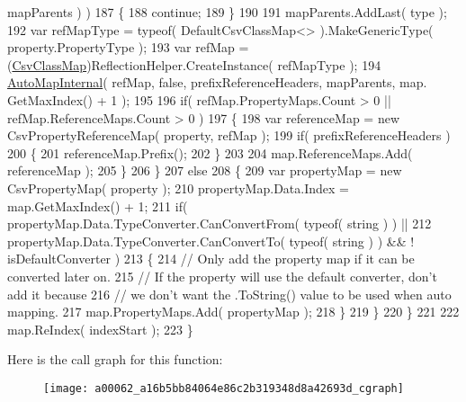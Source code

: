 \begin{DoxyCode}
      mapParents ) )
187                     \{
188                         \textcolor{keywordflow}{continue};
189                     \}
190 
191                     mapParents.AddLast( type );
192                     var refMapType = typeof( DefaultCsvClassMap<> ).MakeGenericType( property.PropertyType 
      );
193                     var refMap = (\hyperlink{a00062_affc5ae8f2b0406d496bcbdf246da6210}{CsvClassMap})ReflectionHelper.CreateInstance( refMapType );
194                     \hyperlink{a00062_a16b5bb84064e86c2b319348d8a42693d}{AutoMapInternal}( refMap, \textcolor{keyword}{false}, prefixReferenceHeaders, mapParents, map.
      GetMaxIndex() + 1 );
195 
196                     \textcolor{keywordflow}{if}( refMap.PropertyMaps.Count > 0 || refMap.ReferenceMaps.Count > 0 )
197                     \{
198                         var referenceMap = \textcolor{keyword}{new} CsvPropertyReferenceMap( property, refMap );
199                         \textcolor{keywordflow}{if}( prefixReferenceHeaders )
200                         \{
201                             referenceMap.Prefix();
202                         \}
203 
204                         map.ReferenceMaps.Add( referenceMap );
205                     \}
206                 \}
207                 \textcolor{keywordflow}{else}
208                 \{
209                     var propertyMap = \textcolor{keyword}{new} CsvPropertyMap( property );
210                     propertyMap.Data.Index = map.GetMaxIndex() + 1;
211                     \textcolor{keywordflow}{if}( propertyMap.Data.TypeConverter.CanConvertFrom( typeof( \textcolor{keywordtype}{string} ) ) ||
212                         propertyMap.Data.TypeConverter.CanConvertTo( typeof( \textcolor{keywordtype}{string} ) ) && !
      isDefaultConverter )
213                     \{
214                         \textcolor{comment}{// Only add the property map if it can be converted later on.}
215                         \textcolor{comment}{// If the property will use the default converter, don't add it because}
216                         \textcolor{comment}{// we don't want the .ToString() value to be used when auto mapping.}
217                         map.PropertyMaps.Add( propertyMap );
218                     \}
219                 \}
220             \}
221 
222             map.ReIndex( indexStart );
223         \}
\end{DoxyCode}


Here is the call graph for this function\-:
\nopagebreak
\begin{figure}[H]
\begin{center}
\leavevmode
\texttt{[image: a00062\_a16b5bb84064e86c2b319348d8a42693d\_cgraph]}
\end{center}
\end{figure}


